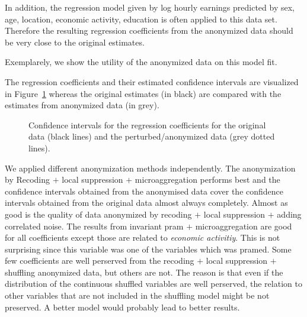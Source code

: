 \documentclass[12pt]{scrartcl}\usepackage[]{graphicx}\usepackage[]{color}
\begin{document}
In addition, the regression model given by log hourly earnings predicted by sex, age, location, economic activity, education is often applied to this data set. Therefore the resulting regression coefficients from the anonymized data should be very close to the original estimates.

Exemplarely, we show the utility of the anonymized data on this model fit.

The regression coefficients and their estimated confidence intervals are visualized in Figure~\ref{fig:ciplots} whereas the original estimates (in black) are compared with the estimates from anonymized data (in grey).

\begin{figure}[ht]
\centering
{}
\caption[]{
  \label{fig:ciplots}Confidence intervals for the regression coefficients for the original data (black lines) and the perturbed/anonymized data (grey dotted lines).}
\end{figure}

We applied different anonymization methods independently.
The anonymization by Recoding $+$ local suppression $+$ microaggregation performs best and the confidence intervals obtained from the anonymised data cover the confidence intervals obtained from the original data almost always completely. Almost as good is the quality of data anonymized by recoding $+$ local suppression $+$ adding correlated noise. The results from invariant pram $+$ microaggregation are good for all coefficients except those are related to \textit{economic activitiy}. This is not surprising since this variable was one of the variables which was pramed. Some few coefficients are well perserved from the recoding $+$ local suppression $+$ shuffling anonymized data, but others are not. The reason is that even if the distribution of the continuous shuffled variables are well perserved, the relation to other variables that are not included in the shuffling model might be not preserved. A better model would probably lead to better results.
\end{document}
